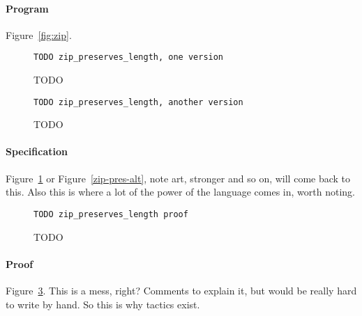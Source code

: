 \paragraph{Program} Figure~\ref{fig:zip}.

\begin{figure}
\begin{lstlisting}
TODO zip_preserves_length, one version
\end{lstlisting}
\caption{TODO}
\label{fig:zip-pres}
\end{figure}

\begin{figure}
\begin{lstlisting}
TODO zip_preserves_length, another version
\end{lstlisting}
\caption{TODO}
\label{fig:zip-pres-alt}
\end{figure}

\paragraph{Specification} Figure~\ref{fig:zip-pres} or Figure~\ref{zip-pres-alt}, note art, stronger and so on, will come back to this.
Also this is where a lot of the power of the language comes in, worth noting.

\begin{figure}
\begin{lstlisting}
TODO zip_preserves_length proof
\end{lstlisting}
\caption{TODO}
\label{fig:zip-pres-proof}
\end{figure}

\paragraph{Proof} Figure~\ref{fig:zip-pres-proof}. This is a mess, right?
Comments to explain it, but would be really hard to write by hand.
So this is why tactics exist.


